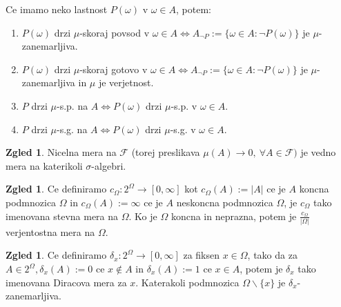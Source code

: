 \documentclass[a4paper,12pt]{article}
\theoremstyle{definition} %
\newtheorem{zgled}[definicija]{Zgled}
\theoremstyle{plain} %
\newcommand{\F}{\mathcal{F}}
\begin{document}
            Ce imamo neko lastnost $P(\omega)$ v $\omega \in A$, potem: 
            \begin{enumerate}
                \item $P(\omega)$ drzi $\mu$-skoraj povsod v $\omega \in A \iff A_{\neg P} := \{\omega \in A: \neg P(\omega)\}$ je $\mu$-zanemarljiva.       
                \item $P(\omega)$ drzi $\mu$-skoraj gotovo v $\omega \in A \iff A_{\neg P} := \{\omega \in A: \neg P(\omega)\}$ je $\mu$-zanemarljiva in $\mu$ je verjetnost.
                \item $P$ drzi $\mu$-s.p. na $A \iff P(\omega)$ drzi $\mu$-s.p. v $\omega \in A$. 
                \item $P$ drzi $\mu$-s.g. na $A \iff P(\omega)$ drzi $\mu$-s.g. v $\omega \in A$. 
            \end{enumerate}
            \begin{zgled}
                Nicelna mera na $\F$ (torej preslikava $\mu(A) \rightarrow 0, \ \forall A \in \F)$ je vedno mera na katerikoli $\sigma$-algebri.
            \end{zgled}      
            
            \begin{zgled}
                Ce definiramo $c_\Omega:2^\Omega \rightarrow [0, \infty]$ kot $c_\Omega(A) := |A|$ ce je $A$ koncna podmnozica $\Omega$ in $c_\Omega(A) := \infty$ ce je $A$ neskoncna podmnozica $\Omega$, je $c_\Omega$ tako imenovana stevna mera na $\Omega$. Ko je $\Omega$ koncna in neprazna, potem je $\frac{c_\Omega}{|\Omega|}$ verjentostna mera na $\Omega$.  
            \end{zgled}

            \begin{zgled}
                Ce definiramo $\delta_x:2^\Omega \rightarrow [0, \infty]$ za fiksen $x \in \Omega$, tako da za $A \in 2^\Omega, \delta_x(A):=0$ ce $x \notin A$ in $\delta_x(A):=1$ ce $x \in A$, potem je $\delta_x$ tako imenovana Diracova mera za $x$. Katerakoli podmnozica $\Omega \backslash \{x\}$ je $\delta_x$-zanemarljiva.                
            \end{zgled}
            
\end{document}
